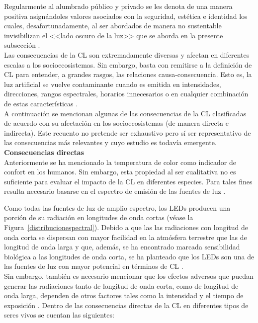 Regularmente al alumbrado público y privado se les denota de una manera positiva asignándoles valores asociados con la seguridad, estética e identidad los cuales, desafortunadamente, al ser abordados de manera no sustentable invisibilizan el <<lado oscuro de la luz>> que se aborda en la presente subsección \citep{Globaldiscussion,LibroCL}.\\ 

Las consecuencias de la CL son extremadamente diversas y afectan en diferentes escalas a los socioecosistemas. Sin embargo, basta con remitirse a la definición de CL para entender, a grandes rasgos, las relaciones causa-consecuencia. Esto es, la luz artificial se vuelve contaminante cuando es emitida en intensidades, direcciones, rangos espectrales, horarios innecesarios o en cualquier combinación de estas características \citep{AtlasREPSA,LibroCL,Stone2017}.\\ 

A continuación se mencionan algunas de las consecuencias de la CL clasificadas de acuerdo con su afectación en los socioecosistemas (de manera directa e indirecta). Este recuento no pretende ser exhaustivo pero sí ser representativo de las consecuencias más relevantes y cuyo estudio es todavía emergente.\\

\textbf{Consecuencias directas}\\ 

Anteriormente se ha mencionado la temperatura de color como indicador de confort en los humanos. Sin embargo, esta propiedad al ser cualitativa no es suficiente para evaluar el impacto de la CL en diferentes especies. Para tales fines resulta necesario basarse en el espectro de emisión de las fuentes de luz \citep{CEI2017}.\\

\newpage

Como todas las fuentes de luz de amplio espectro, los LEDs producen una porción de su radiación en longitudes de onda cortas (véase la Figura~\ref{distribucionespectral}). Debido a que las las radiaciones con longitud de onda corta se dispersan con mayor facilidad en la atmósfera terrestre que las de longitud de onda larga y que, además, se ha encontrado marcada sensibilidad biológica a las longitudes de onda corta, se ha planteado que los LEDs son una de las fuentes de luz con mayor potencial en términos de CL \citep{USENERGY2017}.\\

Sin embargo, también es necesario mencionar que los efectos adversos que puedan generar las radiaciones tanto de longitud de onda corta, como de longitud de onda larga, dependen de otros factores tales como la intensidad y el tiempo de exposición \citep{Globaldiscussion}. Dentro de las consecuencias directas de la CL en diferentes tipos de seres vivos se cuentan las siguientes:\\


